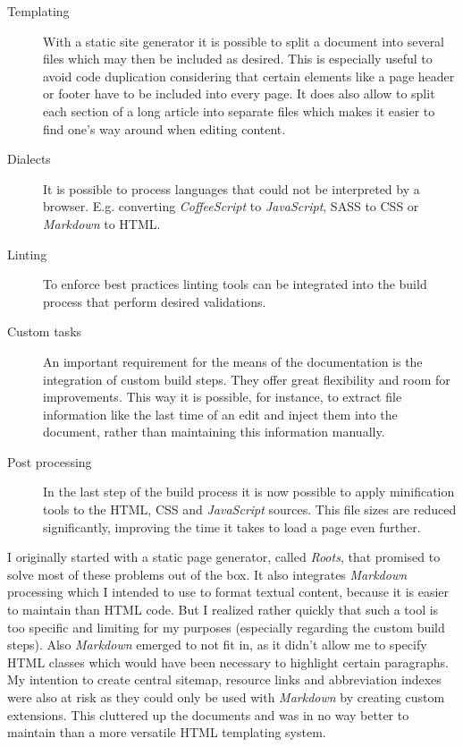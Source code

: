 \begin{description}

	\item[Templating]\hfill

	With a static site generator it is possible to split a document into several files which may then be included as desired. This is especially useful to avoid code duplication considering that certain elements like a page header or footer have to be included into every page. It does also allow to split each section of a long article into separate files which makes it easier to find one's way around when editing content.

	\item[Dialects]\hfill

	It is possible to process languages that could not be interpreted by a browser. E.g. converting \textit{CoffeeScript} to \textit{JavaScript}, \ac{SASS} to \ac{CSS} or \textit{Markdown} to \ac{HTML}.

	\item[Linting]\hfill

	To enforce best practices linting tools can be integrated into the build process that perform desired validations.

	\item[Custom tasks]\hfill

	An important requirement for the means of the documentation is the integration of custom build steps. They offer great flexibility and room for improvements. This way it is possible, for instance, to extract file information like the last time of an edit and inject them into the document, rather than maintaining this information manually.

	\item[Post processing]\hfill

	In the last step of the build process it is now possible to apply minification tools to the \ac{HTML}, \ac{CSS} and \textit{JavaScript} sources. This file sizes are reduced significantly, improving the time it takes to load a page even further.

\end{description}

I originally started with a static page generator, called \textit{Roots}, that promised to solve most of these problems out of the box. It also integrates \textit{Markdown} processing which I intended to use to format textual content, because it is easier to maintain than \ac{HTML} code. But I realized rather quickly that such a tool is too specific and limiting for my purposes (especially regarding the custom build steps). Also \textit{Markdown} emerged to not fit in, as it didn't allow me to specify \ac{HTML} classes which would have been necessary to highlight certain paragraphs. My intention to create central sitemap, resource links and abbreviation indexes were also at risk as they could only be used with \textit{Markdown} by creating custom extensions. This cluttered up the documents and was in no way better to maintain than a more versatile \ac{HTML} templating system.

